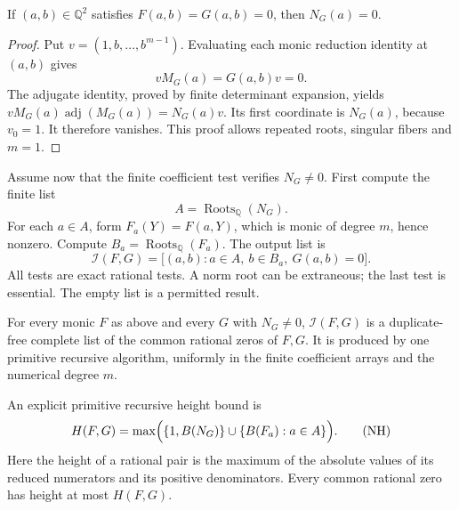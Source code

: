 \begin{lemma}
\label{lem:norm-intersection-vanishing}
If \((a,b)\in\mathbb Q^2\) satisfies \(F(a,b)=G(a,b)=0\), then
\(N_G(a)=0\).
\end{lemma}

\begin{proof}
Put \(v=(1,b,\ldots,b^{m-1})\).  Evaluating each monic reduction
identity at \((a,b)\) gives
\[
 vM_G(a)=G(a,b)v=0.
\]
The adjugate identity, proved by finite determinant expansion, yields
\(vM_G(a)\operatorname{adj}(M_G(a))=N_G(a)v\).  Its first
coordinate is \(N_G(a)\), because \(v_0=1\).  It therefore vanishes.
This proof allows repeated roots, singular fibers and \(m=1\).
\end{proof}

Assume now that the finite coefficient test verifies \(N_G\ne0\).
First compute the finite list
\[
 A=\operatorname{Roots}_{\mathbb Q}(N_G).
\]
For each \(a\in A\), form \(F_a(Y)=F(a,Y)\), which is monic
of degree \(m\), hence nonzero.  Compute
\(B_a=\operatorname{Roots}_{\mathbb Q}(F_a)\).  The output list is
\[
 \mathcal I(F,G)
 =\bigl[(a,b):a\in A,\ b\in B_a,\ G(a,b)=0\bigr].
 \tag{NI}\label{eq:norm-intersection-list}
\]
All tests are exact rational tests.  A norm root can be extraneous;
the last test is essential.  The empty list is a permitted result.

\begin{theorem}
\label{thm:norm-complete-intersection}
For every monic \(F\) as above and every \(G\) with \(N_G\ne0\),
\(\mathcal I(F,G)\) is a duplicate-free complete list of the
common rational zeros of \(F,G\).  It is produced by one primitive
recursive algorithm, uniformly in the finite coefficient arrays and
the numerical degree \(m\).

An explicit primitive recursive height bound is
\[
 H(F,G)=\max\Bigl(\{1,B(N_G)\}
       \cup\{B(F_a):a\in A\}\Bigr).
 \tag{NH}\label{eq:norm-intersection-height}
\]
Here the height of a rational pair is the maximum of the absolute
values of its reduced numerators and its positive denominators.
Every common rational zero has height at most \(H(F,G)\).
\end{theorem}

